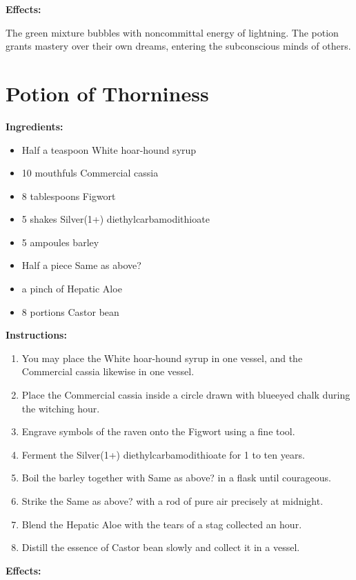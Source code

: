 \documentclass{article}
\begin{document}
\textbf{Effects:}

The green mixture bubbles with noncommittal energy of lightning. The potion grants mastery over their own dreams, entering the subconscious minds of others.

\newpage
\section*{Potion of Thorniness}

\textbf{Ingredients:}

\begin{itemize}
  \item Half a teaspoon White hoar-hound syrup
  \item 10 mouthfuls Commercial cassia
  \item 8 tablespoons Figwort
  \item 5 shakes Silver(1+) diethylcarbamodithioate
  \item 5 ampoules barley
  \item Half a piece Same as above?
  \item a pinch of Hepatic Aloe
  \item 8 portions Castor bean
\end{itemize}

\textbf{Instructions:}

\begin{enumerate}
  \item You may place the White hoar-hound syrup in one vessel, and the Commercial cassia likewise in one vessel.
  \item Place the Commercial cassia inside a circle drawn with blueeyed chalk during the witching hour.
  \item Engrave symbols of the raven onto the Figwort using a fine tool.
  \item Ferment the Silver(1+) diethylcarbamodithioate for 1 to ten years.
  \item Boil the barley together with Same as above? in a flask until courageous.
  \item Strike the Same as above? with a rod of pure air precisely at midnight.
  \item Blend the Hepatic Aloe with the tears of a stag collected an hour.
  \item Distill the essence of Castor bean slowly and collect it in a vessel.
\end{enumerate}

\textbf{Effects:}
\end{document}
